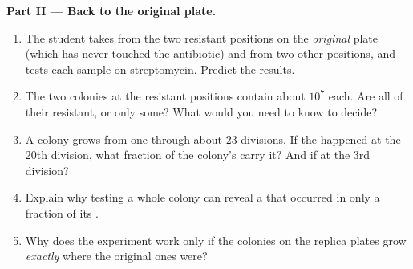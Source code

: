 \begin{problem}
\medskip
\noindent\textbf{Part II --- Back to the original plate.}
\begin{enumerate}[resume]
  \item The student takes  from the two resistant positions on
        the \emph{original} plate (which has never touched the
        antibiotic) and from two other positions, and tests each
        sample on streptomycin. Predict the results.
  \item The two colonies at the resistant positions contain about
        $10^7$  each. Are all of their  resistant, or only
        some? What would you need to know to decide?
  \item A colony grows from one  through about 23 divisions. If
        the  happened at the 20th division, what fraction of
        the colony's  carry it? And if at the 3rd division?
  \item Explain why testing a whole colony can reveal a  that
        occurred in only a fraction of its .
  \item Why does the experiment work only if the colonies on the
        replica plates grow \emph{exactly} where the original ones
        were?
\end{enumerate}


\end{problem}
